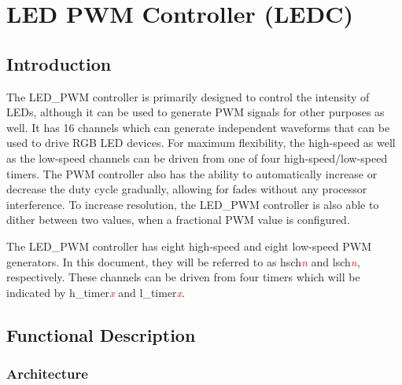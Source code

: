 \documentclass[main\_\_EN.tex]{subfiles}
\begin{document}
\setenglishformatting

\ifglobal
\else
    \listoftodos
    {\let\clearpage\relax \listofdonetodos}
    \tableofcontents
\fi



\hypertarget{ledpwm}{}
\chapter{LED PWM Controller (LEDC)}
\label{mod:ledpwm}

\section{Introduction}

The LED\_PWM controller is primarily designed to control the intensity of LEDs, although it can be used to generate PWM signals for other purposes as well. It has 16 channels which can generate independent waveforms that can be used to drive RGB LED devices. For maximum flexibility, the high-speed as well as the low-speed channels can be driven from one of four high-speed/low-speed timers. The PWM controller also has the ability to automatically increase or decrease the duty cycle gradually, allowing for fades without any processor interference. To increase resolution, the LED\_PWM controller is also able to dither between two values, when a fractional PWM value is configured.

The LED\_PWM controller has eight high-speed and eight low-speed PWM generators. In this document, they will be referred to as hsch\textcolor{red}{\it{n}} and lsch\textcolor{red}{\it{n}}, respectively. These channels can be driven from four timers which will be indicated by h\_timer\textcolor{red}{\it{x}} and l\_timer\textcolor{red}{\it{x}}.
\vspace{-2em}

\section{Functional Description}

\subsection{Architecture}
\end{document}
